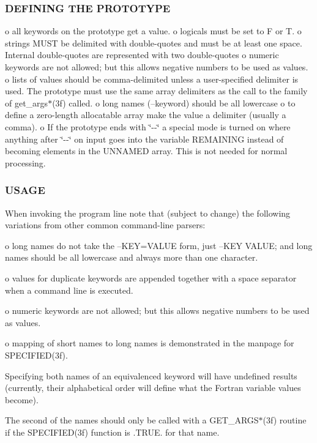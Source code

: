 \subsubsection*{D\+E\+F\+I\+N\+I\+NG T\+HE P\+R\+O\+T\+O\+T\+Y\+PE}

o all keywords on the prototype get a value. o logicals must be set to F or T. o strings M\+U\+ST be delimited with double-\/quotes and must be at least one space. Internal double-\/quotes are represented with two double-\/quotes o numeric keywords are not allowed; but this allows negative numbers to be used as values. o lists of values should be comma-\/delimited unless a user-\/specified delimiter is used. The prototype must use the same array delimiters as the call to the family of get\+\_\+args$\ast$(3f) called. o long names (--keyword) should be all lowercase o to define a zero-\/length allocatable array make the value a delimiter (usually a comma). o If the prototype ends with \char`\"{}-\/-\/\char`\"{} a special mode is turned on where anything after \char`\"{}-\/-\/\char`\"{} on input goes into the variable R\+E\+M\+A\+I\+N\+I\+NG instead of becoming elements in the U\+N\+N\+A\+M\+ED array. This is not needed for normal processing. \subsubsection*{U\+S\+A\+GE}

When invoking the program line note that (subject to change) the following variations from other common command-\/line parsers\+:

o long names do not take the --K\+EY=V\+A\+L\+UE form, just --K\+EY V\+A\+L\+UE; and long names should be all lowercase and always more than one character.

o values for duplicate keywords are appended together with a space separator when a command line is executed.

o numeric keywords are not allowed; but this allows negative numbers to be used as values.

o mapping of short names to long names is demonstrated in the manpage for S\+P\+E\+C\+I\+F\+I\+E\+D(3f).

Specifying both names of an equivalenced keyword will have undefined results (currently, their alphabetical order will define what the Fortran variable values become).

The second of the names should only be called with a G\+E\+T\+\_\+\+A\+R\+G\+S$\ast$(3f) routine if the S\+P\+E\+C\+I\+F\+I\+E\+D(3f) function is .T\+R\+UE. for that name.

